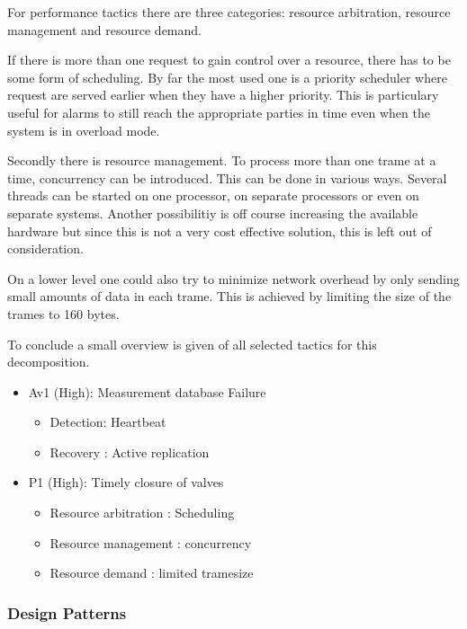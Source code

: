 \npar For performance tactics there are three categories: resource
arbitration, resource management and resource demand.

\npar If there is more than one request to gain control over a resource, there
has to be some form of scheduling. By far the most used one is a priority
scheduler where request are served earlier when they have a higher priority.
This is particulary useful for alarms to still reach the appropriate parties in
time even when the system is in overload mode. 

\npar Secondly there is resource management. To process more than one trame at a
time, concurrency can be introduced. This can be done in various ways. Several
threads can be started on one processor, on separate processors or even on
separate systems. Another possibilitiy is off course increasing the available
hardware but since this is not a very cost effective solution, this is left out
of consideration.

\npar On a lower level one could also try to minimize network overhead by
only sending small amounts of data in each trame. This is achieved by
limiting the size of the trames to 160 bytes.

\npar To conclude a small overview is given of all selected tactics for this
decomposition.

\begin{itemize}
 	\item Av1 (High): Measurement database Failure
 	\begin{itemize}
 		\item Detection: Heartbeat 
 		\item Recovery : Active replication
 	\end{itemize}
  	\item P1 (High): Timely closure of valves
  	\begin{itemize}
  		\item Resource arbitration : Scheduling
		\item Resource management  : concurrency
		\item Resource demand      : limited tramesize
  	\end{itemize}
\end{itemize}

\subsubsection{Design Patterns}
\label{add:it1/patterns} %

